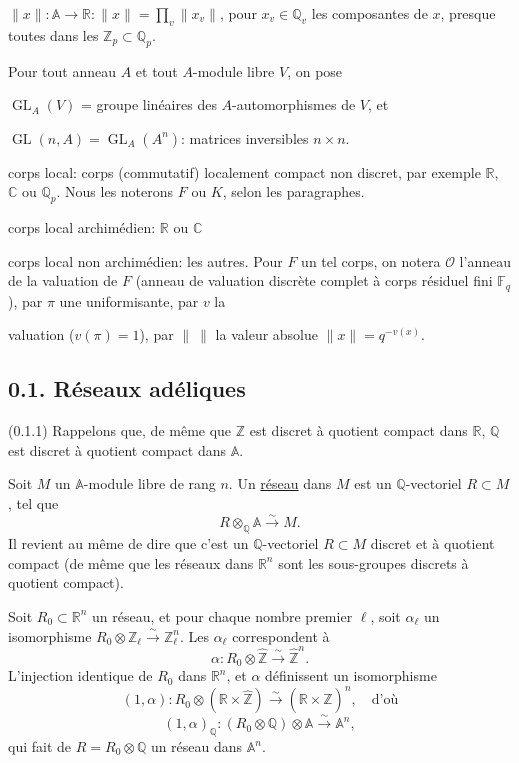 \documentclass[10pt,a4paper]{article}
\providecommand{\GL}{\operatorname{GL}}
\providecommand{\R}{\mathbb R}
\providecommand{\Q}{\mathbb Q}
\providecommand{\Z}{\mathbb Z}
\providecommand{\C}{\mathbb C}
\providecommand{\A}{\mathbb A}
\begin{document}
\noindent $\|x\|:\A\longrightarrow\R:\|x\|=\prod_v\|x_v\|$, pour $x_v\in\Q_v$ les composantes de $x$, presque toutes dans les $\Z_p\subset\Q_p$.

Pour tout anneau $A$ et tout $A$-module libre $V$, on pose

\noindent $\GL_A(V)$ = groupe linéaires des $A$-automorphismes de $V$, et

\noindent $\GL(n,A)=\GL_A(A^n)$: matrices inversibles $n\times n$.

\noindent corps local: corps (commutatif) localement compact non discret, par exemple $\R$, $\C$ ou $\Q_p$. Nous les noterons $F$ ou $K$, selon les paragraphes.

\noindent corps local archimédien: $\R$ ou $\C$

\noindent corps local non archimédien: les autres. Pour $F$ un tel corps, on notera $\mathcal O$ l'anneau de la valuation de $F$ (anneau de valuation discrète complet à corps résiduel fini $\mathbb F_q$), par $\pi$ une uniformisante, par $v$ la

\clearpage
{}
\hypertarget{authority-5}{}
valuation ($v(\pi)=1$), par $\|\ \|$ la valeur absolue $\|x\|=q^{-v(x)}$.

\subsection*{0.1. Réseaux adéliques}
(0.1.1) Rappelons que, de même que $\Z$ est discret à quotient compact dans $\R$, $\Q$ est discret à quotient compact dans $\A$.

Soit $M$ un $\A$-module libre de rang $n$. Un \underline{réseau} dans $M$ est un $\Q$-vectoriel $R\subset M$, tel que
\[
R\otimes_{\Q}\A\xrightarrow{\sim}M.
\]
Il revient au même de dire que c'est un $\Q$-vectoriel $R\subset M$ discret et à quotient compact (de même que les réseaux dans $\R^n$ sont les sous-groupes discrets à quotient compact).

Soit $R_0\subset\R^n$ un réseau, et pour chaque nombre premier $\ell$, soit $\alpha_\ell$ un isomorphisme $R_0\otimes\Z_\ell\xrightarrow{\sim}\Z_\ell^n$. Les $\alpha_\ell$ correspondent à
\[
\alpha:R_0\otimes\widehat{\Z}\xrightarrow{\sim}\widehat{\Z}^{n}.
\]
L'injection identique de $R_0$ dans $\R^n$, et $\alpha$ définissent un isomorphisme
\[
(1,\alpha):R_0\otimes(\R\times\widehat{\Z})\xrightarrow{\sim}(\R\times\widehat{\Z})^n,\quad\text{d'où}
\]
\[
(1,\alpha)_{\Q}:(R_0\otimes\Q)\otimes\A\xrightarrow{\sim}\A^n,
\]
qui fait de $R=R_0\otimes\Q$ un réseau dans $\A^n$.
\end{document}
